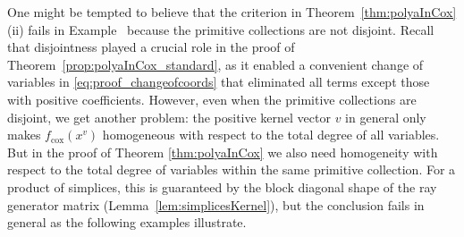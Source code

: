 \documentclass[a4paper,11pt]{amsart}
\theoremstyle{definition}
\newcommand{\cox}{\mathrm{cox}}
\begin{document}
One might be tempted to believe that the criterion in Theorem~\eqref{thm:polyaInCox}(ii) fails in Example~ because the primitive collections are not disjoint. Recall that disjointness played a crucial role in the proof of Theorem~\ref{prop:polyaInCox_standard}, as it enabled a convenient change of variables in \eqref{eq:proof_changeofcoords} that eliminated all terms except those with positive coefficients.
However, even when the primitive collections are disjoint, we get another problem: the positive kernel vector $v$ in general only makes $f_\cox(x^v)$ homogeneous with respect to the total degree of all variables. 
But in the proof of Theorem \ref{thm:polyaInCox} we also need homogeneity with respect to the total degree of variables within the same primitive collection.
For a product of simplices, this is guaranteed by the block diagonal shape of the ray generator matrix (Lemma~\ref{lem:simplicesKernel}), but the conclusion fails in general as the following examples illustrate.
\end{document}
